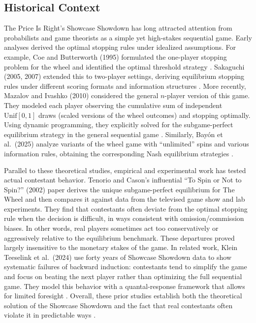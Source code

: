 \documentclass[titlepage,12pt]{article}
\begin{document}
\subsection{Historical Context}

The Price Is Right’s Showcase Showdown  has long attracted attention from probabilists and game theorists as a simple yet high-stakes sequential game. Early analyses derived the optimal stopping rules under idealized assumptions. For example, Coe and Butterworth (1995) formulated the one-player stopping problem for the wheel and identified the optimal threshold strategy \cite{Coe1995}. Sakaguchi (2005, 2007) extended this to two-player settings, deriving equilibrium stopping rules under different scoring formats and information structures \cite{Sakaguchi2005,Sakaguchi2007}. More recently, Mazalov and Ivashko (2010) considered the general $n$-player version of this game. They modeled each player observing the cumulative sum of independent $\mathrm{Unif}[0,1]$ draws (scaled versions of the wheel outcomes) and stopping optimally. Using dynamic programming, they explicitly solved for the subgame-perfect equilibrium strategy in the general sequential game \cite{Mazalov2010}. Similarly, Bayón et al.\ (2025) analyze variants of the wheel game with “unlimited” spins and various information rules, obtaining the corresponding Nash equilibrium strategies \cite{Bayon2025}.

Parallel to these theoretical studies, empirical and experimental work has tested actual contestant behavior. Tenorio and Cason’s influential “To Spin or Not to Spin?” (2002) paper derives the unique subgame-perfect equilibrium for The Wheel and then compares it against data from the televised game show and lab experiments. They find that contestants often deviate from the optimal stopping rule when the decision is difficult, in ways consistent with omission/commission biases. In other words, real players sometimes act too conservatively or aggressively relative to the equilibrium benchmark. These departures proved largely insensitive to the monetary stakes of the game. In related work, Klein Teeselink et al.\ (2024) use forty years of Showcase Showdown data to show systematic failures of backward induction: contestants tend to simplify the game and focus on beating the next player rather than optimizing the full sequential game. They model this behavior with a quantal-response framework that allows for limited foresight \cite{Teeselink2024}. Overall, these prior studies establish both the theoretical solution of the Showcase Showdown and the fact that real contestants often violate it in predictable ways \cite{ChatGPT2026}.
\end{document}
